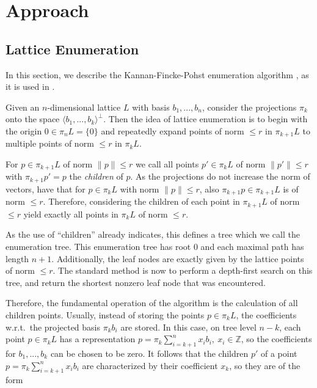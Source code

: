 \documentclass{scrartcl}
\newcommand{\Z}{\mathbb{Z}}
\begin{document}
    \section{Approach}

    \label{sec:enumeration}

    \subsection{Lattice Enumeration}

    In this section, we describe the Kannan-Fincke-Pohst enumeration algorithm \cite{enum1, enum}, as it is used in \cite{fplll}.

    Given an $n$-dimensional lattice $L$ with basis $b_1, ..., b_n$, consider the projections $\pi_k$ onto the space $\langle b_1, ..., b_k \rangle^\perp$. Then the idea of lattice enumeration is to begin with the origin $0 \in \pi_n L = \{ 0 \}$ and repeatedly expand points of norm $\leq r$ in $\pi_{k + 1} L$ to multiple points of norm $\leq r$ in $\pi_k L$.
    
    For $p \in \pi_{k + 1} L$ of norm $\| p \| \leq r$ we call all points $p' \in \pi_k L$ of norm $\| p' \| \leq r$ with $\pi_{k + 1} p' = p$ the \emph{children} of $p$. As the projections do not increase the norm of vectors, have that for $p \in \pi_k L$ with norm $\| p \| \leq r$, also $\pi_{k + 1} p \in \pi_{k + 1}L$ is of norm $\leq r$. Therefore, considering the children of each point in $\pi_{k + 1}L$ of norm $\leq r$ yield exactly all points in $\pi_k L$ of norm $\leq r$.

    As the use of ``children'' already indicates, this defines a tree which we call the enumeration tree. This enumeration tree has root $0$ and each maximal path has length $n + 1$. Additionally, the leaf nodes are exactly given by the lattice points of norm $\leq r$.
    The standard method is now to perform a depth-first search on this tree, and return the shortest nonzero leaf node that was encountered.

    Therefore, the fundamental operation of the algorithm is the calculation of all children points. Usually, instead of storing the points $p \in \pi_k L$, the coefficients w.r.t.\ the projected basis $\pi_k b_i$ are stored. 
    In this case, on tree level $n - k$, each point $p \in \pi_k L$ has a representation $p = \pi_k \sum_{i = k + 1}^n x_i b_i , \ x_i \in \Z$, so the coefficients for $b_1, ..., b_k$ can be chosen to be zero. 
    It follows that the children $p'$ of a point $p = \pi_k \sum_{i = k + 1}^n x_i b_i$ are characterized by their coefficient $x_k$, so they are of the form
    
\end{document}
